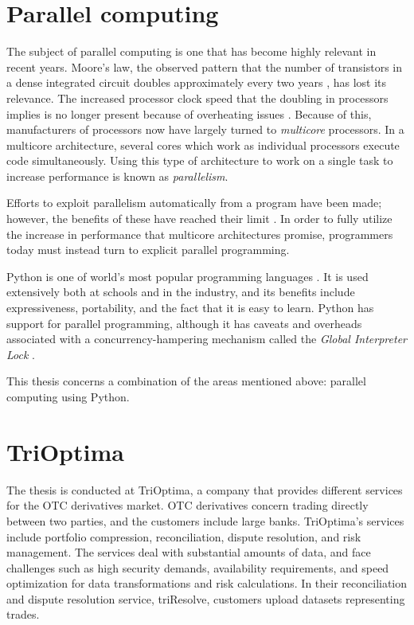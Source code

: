 \section{Parallel computing}
The subject of parallel computing is one that has become highly relevant in recent years.
Moore's law, the observed pattern that the number of transistors in a dense integrated circuit doubles approximately every two
years \cite{moore_1998_cramming_cmcoic},
has lost its relevance. The increased processor clock speed that the doubling in processors implies is no longer present because of
overheating issues \cite[p. 1]{herlihy_2012_art_taomprr}. Because of this, manufacturers of processors now have
largely turned to \emph{multicore} processors. In a multicore architecture, several cores which work as individual processors execute
code simultaneously. Using this type of architecture to work on a single task to increase performance is known as \emph{parallelism}.

Efforts to exploit parallelism automatically from a program have been made; however, the benefits of these have reached their
limit \cite[p. 7-12]{mccool_2012_structured_spppfec}. In order to fully utilize the increase in performance that multicore
architectures promise, programmers today must instead turn to explicit parallel programming.

Python is one of world's most popular programming languages \cite{krill_2015_python_psnhilp}. It is used extensively both at schools and
in the industry, and its benefits include expressiveness, portability, and the fact that it is easy to learn. Python has support for
parallel programming, although it has caveats and overheads associated with a concurrency-hampering mechanism called the
\emph{Global Interpreter Lock} \cite{beazley_150745UTC_introduction_aitpc}.

This thesis concerns a combination of the areas mentioned above: parallel computing using Python.

\section{TriOptima} \label{trioptima}
The thesis is conducted at TriOptima, a company that provides different services for the OTC derivatives market.
OTC derivatives concern trading directly between two parties, and the customers include large banks. TriOptima’s services
include portfolio compression, reconciliation, dispute resolution, and risk management. The services deal with substantial
amounts of data, and face challenges such as high security demands, availability requirements, and speed optimization
for data transformations and risk calculations. In their reconciliation and dispute resolution service,
triResolve, customers upload datasets representing trades. 

